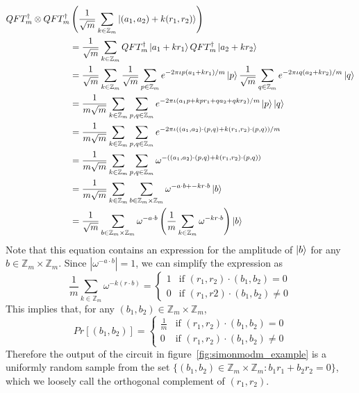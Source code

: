 \begin{align*}
    QFT_m^{\dagger} \otimes QFT_m^{\dagger}& \left(\frac{1}{\sqrt{m}}\sum_{k\in\mathbb{Z}_m} \ket{(a_1,a_2)+k(r_1,r_2)}\right)\\
    &=\frac{1}{\sqrt{m}}\sum_{k\in\mathbb{Z}_m}QFT_m^{\dagger}\ket{a_1+kr_1} QFT_m^{\dagger} \ket{a_2+kr_2}\\
    &=\frac{1}{\sqrt{m}}\sum_{k\in\mathbb{Z}_m}\frac{1}{\sqrt{m}}\sum_{p\in\mathbb{Z}_m}e^{-2\pi\iota p(a_1+kr_1)/m}\ket{p}\frac{1}{\sqrt{m}}\sum_{q\in\mathbb{Z}_m}e^{-2\pi\iota q(a_2+kr_2)/m}\ket{q}\\
    &=\frac{1}{m\sqrt{m}}\sum_{k\in\mathbb{Z}_m}\sum_{p,q\in\mathbb{Z}_m} e^{-2\pi\iota (a_1p +kpr_1+qa_2+qkr_2)/m}\ket{p}\ket{q}\\
    &=\frac{1}{m\sqrt{m}}\sum_{k\in\mathbb{Z}_m}\sum_{p,q\in\mathbb{Z}_m}e^{-2\pi\iota ((a_1,a_2)\cdot (p,q) + k(r_1,r_2)\cdot (p,q))/m}\\
    &=\frac{1}{m\sqrt{m}}\sum_{k\in\mathbb{Z}_m}\sum_{p,q\in\mathbb{Z}_m}\omega^{-((a_1,a_2)\cdot (p,q) + k(r_1,r_2)\cdot (p,q))}\\
    &=\frac{1}{m\sqrt{m}}\sum_{k\in\mathbb{Z}_m}\sum_{b\in\mathbb{Z}_m\times \mathbb{Z}_m}\omega^{-a\cdot b + -kr \cdot b} \ket{b}\\
    &=\frac{1}{\sqrt{m}}\sum_{b\in\mathbb{Z}_m\times \mathbb{Z}_m}  \omega^{-a\cdot b}\left( \frac{1}{m}\sum_{k\in\mathbb{Z}_m}\omega^{-kr\cdot b}\right)\ket{b}
\end{align*}
Note that this equation contains an expression for the amplitude of $\ket{b}$ for any $b\in\mathbb{Z}_m\times \mathbb{Z}_m$. Since $|\omega^{-a\cdot b}|=1$, we can simplify the expression as
\[
\frac{1}{m}\sum_{k\in\mathbb{Z}_m}\omega^{-k(r\cdot b)}=\begin{cases}
    1 &\text{if $(r_1,r_2)\cdot (b_1,b_2)=0$}\\
    0&\text{if $(r_1,r2)\cdot (b_1,b_2)\neq 0$}
\end{cases}
\]
This implies that, for any $(b_1,b_2)\in\mathbb{Z}_m\times \mathbb{Z}_m$,
\[
Pr[(b_1,b_2)]=\begin{cases}
    \frac{1}{m}&\text{if $(r_1,r_2)\cdot (b_1,b_2)=0$}\\
    0&\text{if $(r_1,r_2)\cdot (b_1,b_2)\neq 0$}
\end{cases}
\]
Therefore the output of the circuit in figure~\ref{fig:simonmodm_example} is a uniformly random sample from the set $\{(b_1,b_2)\in\mathbb{Z}_m\times \mathbb{Z}_m : b_1r_1+b_2r_2=0\}$, which we loosely call the orthogonal complement of $(r_1,r_2)$.

